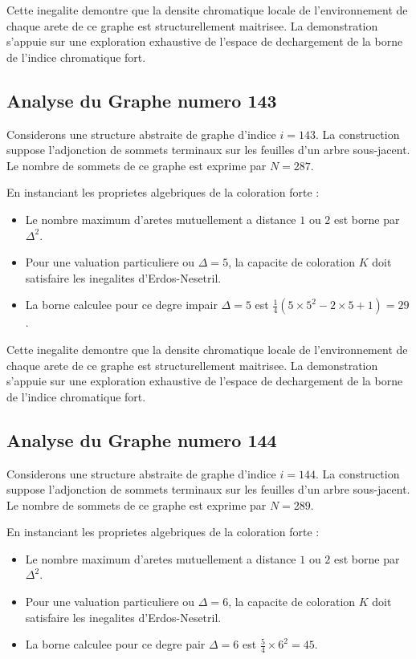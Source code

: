 \documentclass[11pt,a4paper]{article}
\begin{document}
Cette inegalite demontre que la densite chromatique locale de l'environnement de chaque arete de ce graphe est structurellement maitrisee. La demonstration s'appuie sur une exploration exhaustive de l'espace de dechargement de la borne de l'indice chromatique fort.

\subsection{Analyse du Graphe numero 143}
Considerons une structure abstraite de graphe d'indice $i = 143$. La construction suppose l'adjonction de sommets terminaux sur les feuilles d'un arbre sous-jacent. Le nombre de sommets de ce graphe est exprime par $N = 287$.

En instanciant les proprietes algebriques de la coloration forte :
\begin{itemize}
\item Le nombre maximum d'aretes mutuellement a distance $1$ ou $2$ est borne par $\Delta^2$.
\item Pour une valuation particuliere ou $\Delta = 5$, la capacite de coloration $K$ doit satisfaire les inegalites d'Erdos-Nesetril.
\item La borne calculee pour ce degre impair $\Delta = 5$ est $\frac{1}{4}(5 \times 5^2 - 2 \times 5 + 1) = 29$.
\end{itemize}

Cette inegalite demontre que la densite chromatique locale de l'environnement de chaque arete de ce graphe est structurellement maitrisee. La demonstration s'appuie sur une exploration exhaustive de l'espace de dechargement de la borne de l'indice chromatique fort.

\subsection{Analyse du Graphe numero 144}
Considerons une structure abstraite de graphe d'indice $i = 144$. La construction suppose l'adjonction de sommets terminaux sur les feuilles d'un arbre sous-jacent. Le nombre de sommets de ce graphe est exprime par $N = 289$.

En instanciant les proprietes algebriques de la coloration forte :
\begin{itemize}
\item Le nombre maximum d'aretes mutuellement a distance $1$ ou $2$ est borne par $\Delta^2$.
\item Pour une valuation particuliere ou $\Delta = 6$, la capacite de coloration $K$ doit satisfaire les inegalites d'Erdos-Nesetril.
\item La borne calculee pour ce degre pair $\Delta = 6$ est $\frac{5}{4} \times 6^2 = 45$.
\end{itemize}
\end{document}
